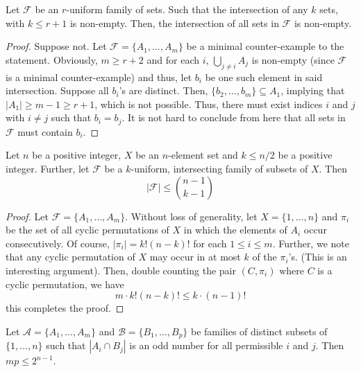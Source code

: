 \begin{lemma}
    Let $\mathcal{F}$ be an $r$-uniform family of sets. Such that the intersection of any $k$ sets, with $k\le r + 1$ is non-empty. Then, the intersection of all sets in $\mathcal{F}$ is non-empty.
\end{lemma}
\begin{proof}
    Suppose not. Let $\mathcal{F} = \{A_1,\ldots,A_m\}$ be a minimal counter-example to the statement. Obviously, $m\ge r + 2$ and for each $i$, $\bigcup_{j\ne i} A_j$ is non-empty (since $\mathcal{F}$ is a minimal counter-example) and thus, let $b_i$ be one such element in said intersection. Suppose all $b_i$'s are distinct. Then, $\{b_2,\ldots,b_m\}\subseteq A_1$, implying that $|A_1|\ge m - 1\ge r + 1$, which is not possible. Thus, there must exist indices $i$ and $j$ with $i\ne j$ such that $b_i = b_j$. It is not hard to conclude from here that all sets in $\mathcal{F}$ must contain $b_i$.
\end{proof}

\begin{theorem}
    Let $n$ be a positive integer, $X$ be an $n$-element set and $k\le n/2$ be a positive integer. Further, let $\mathcal{F}$ be a $k$-uniform, intersecting family of subsets of $X$. Then 
    \begin{equation*}
        |\mathcal{F}|\le\binom{n - 1}{k - 1}
    \end{equation*}
\end{theorem}
\begin{proof}
    Let $\mathcal{F} = \{A_1,\ldots,A_m\}$. Without loss of generality, let $X = \{1,\ldots,n\}$ and $\pi_i$ be the set of all cyclic permutations of $X$ in which the elements of $A_i$ occur consecutively. Of course, $|\pi_i| = k!(n - k)!$ for each $1\le i\le m$. Further, we note that any cyclic permutation of $X$ may occur in at most $k$ of the $\pi_i$'s. (This is an interesting argument). Then, double counting the pair $(C,\pi_i)$ where $C$ is a cyclic permutation, we have 
    \begin{equation*}
        m\cdot k!(n - k)!\le k\cdot(n - 1)!
    \end{equation*}
    this completes the proof.
\end{proof}

\begin{theorem}
    Let $\mathscr{A} = \{A_1,\ldots,A_m\}$ and $\mathscr{B} = \{B_1,\ldots,B_p\}$ be families of distinct subsets of $\{1,\ldots,n\}$ such that $|A_i\cap B_j|$ is an odd number for all permissible $i$ and $j$. Then $mp\le 2^{n - 1}$.
\end{theorem}